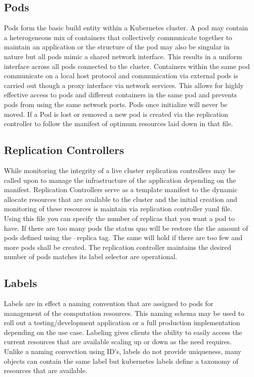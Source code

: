 \documentclass{article}
\begin{document}
\subsection{Pods}
Pods form the basic build entity within a Kubernetes cluster. A pod may contain a heterogeneous mix of containers that collectively communicate together to maintain an application or the structure of the pod may also be singular in nature but all pods mimic a shared network interface. This results in a uniform interface across all pods connected to the cluster. Containers within the same pod communicate on a local host protocol and communication via external pods is carried out though a proxy interface via network services. This allows for highly effective access to pods and different containers in the same pod and prevents pods from using the same network ports. Pods once initialize will never be moved. If a Pod is lost or removed a new pod is created via the replication controller to follow the manifest of optimum resources laid down in that file.
\subsection{Replication Controllers}
While monitoring the integrity of a live cluster replication controllers may be called upon to manage the infrastructure of the application depending on the manifest. Replication Controllers serve as a template manifest to the dynamic allocate resources that are available to the cluster and the initial creation and monitoring of these resources is maintain via replication controller yaml file.  Using this file you can specify the number of replicas that you want a pod to have. If there are too many pods the status quo will be restore the the amount of pods defined using the –replica tag. The same will hold if there are too few and more pods shall be created.  The replication controller maintains the desired number of pods matches its label selector are operational.
\subsection{Labels}
Labels are in effect a naming convention that are assigned to pods for management of the computation resources. This naming schema may be used to roll out a testing/development application or a full production implementation depending on the use case. Labeling gives clients the ability to easily access the current resources that are available scaling up or down as the need requires.
Unlike a naming convection using ID’s, labels do not provide uniqueness, many objects can contain the same label but kubernetes labels define a taxonomy of resources that are available.
\end{document}
